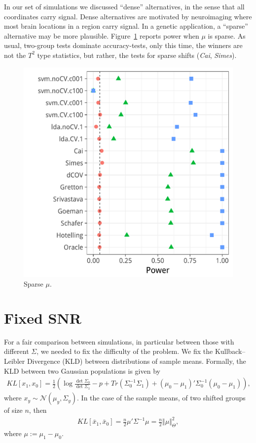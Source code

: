 \documentclass[]{bio}
\begin{document}
In our set of simulations we discussed ``dense'' alternatives, in the sense that all coordinates carry signal.
Dense alternatives are motivated by neuroimaging where most brain locations in a region carry signal.
In a genetic application, a ``sparse'' alternative may be more plausible. 
Figure~\ref{fig:sparse} reports power when $\mu$ is sparse. 
As usual, two-group tests dominate accuracy-tests, only this time, the winners are not the $T^2$ type statistics, but rather, the tests for sparse shifts (\emph{Cai}, \emph{Simes}).

\begin{figure}[ht]
	\centering
	\centering
	\includegraphics[width=0.7\columnwidth]{"art/file34"}
	\caption{Sparse $\mu$.}  
	\label{fig:sparse}	
\end{figure}





\section{Fixed SNR}
\label{sec:fix_snr}

For a fair comparison between simulations, in particular between those with different $\Sigma$, we needed to fix the difficulty of the problem.
We fix the Kullback–Leibler Divergence (KLD) between distributions of sample means. 
Formally, the KLD between two Gaussian populations is given by 
\begin{align}
\label{eq:KLD}
	KL[x_1,x_0]=\frac{1}{2}\left(
	\log \frac{\det \Sigma_0}{\det \Sigma_1}-p+Tr(\Sigma_0^{-1}\Sigma_1)+(\mu_0-\mu_1)'\Sigma^{-1}_0(\mu_0-\mu_1)
	\right),
\end{align}
where $x_y\sim\mathcal{N}(\mu_y,\Sigma_y)$.
In the case of the sample means, of two shifted groups of size $n$, then 
\begin{align}
\label{eq:mahalanobis}
	KL[\bar x_1,\bar x_0]=
	\frac{n}{2}\mu'\Sigma^{-1}\mu=
	\frac{n}{2}\Vert \mu \Vert_\Theta^2,
\end{align}
where $\mu:=\mu_1-\mu_0$. 
\end{document}
